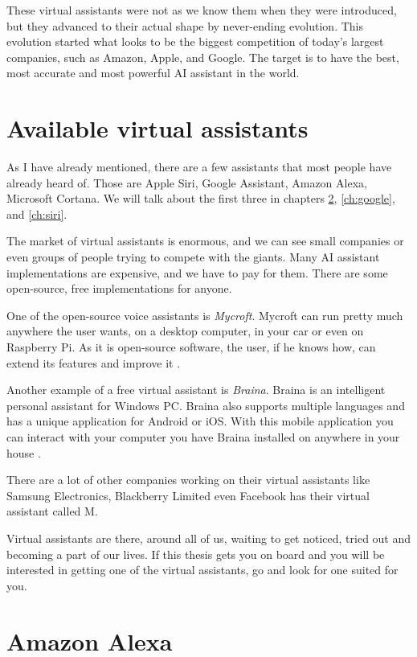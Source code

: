 \documentclass[
  digital, %
  oneside, %
  table,   %
  lof,     %
  lot,     %
]{fithesis3}
\begin{document}
These virtual assistants were not as we know them when they were introduced, but they advanced to their actual shape by never-ending evolution. This evolution started what looks to be the biggest competition of today's largest companies, such as Amazon, Apple, and Google. The target is to have the best, most accurate and most powerful AI assistant in the world.

\chapter{Available virtual assistants}

As I have already mentioned, there are a few assistants that most people have already heard of. Those are Apple Siri, Google Assistant, Amazon Alexa, Microsoft Cortana. We will talk about the first three in chapters \ref{ch:alexa}, \ref{ch:google}, and \ref{ch:siri}.

The market of virtual assistants is enormous, and we can see small companies or even groups of people trying to compete with the giants. Many AI assistant implementations are expensive, and we have to pay for them. There are some open-source, free implementations for anyone. 

One of the open-source voice assistants is \textit{Mycroft}. Mycroft can run pretty much anywhere the user wants, on a desktop computer, in your car or even on Raspberry Pi. As it is open-source software, the user, if he knows how, can extend its features and improve it \parencite{mycroft}.

Another example of a free virtual assistant is \textit{Braina}. Braina is an intelligent personal assistant for Windows PC. Braina also supports multiple languages and has a unique application for Android or iOS. With this mobile application you can interact with your computer you have Braina installed on anywhere in your house \parencite{braina}.

There are a lot of other companies working on their virtual assistants like Samsung Electronics, Blackberry Limited even Facebook has their virtual assistant called M.

Virtual assistants are there, around all of us, waiting to get noticed, tried out and becoming a part of our lives. If this thesis gets you on board and you will be interested in getting one of the virtual assistants, go and look for one suited for you.

\chapter{Amazon Alexa}\label{ch:alexa}
\end{document}
